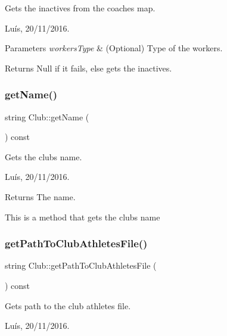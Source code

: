 Gets the inactives from the coaches map. 

Luís, 20/11/2016. 


\begin{DoxyParams}{Parameters}
{\em workers\+Type} & (Optional) Type of the workers. \\
\hline
\end{DoxyParams}


\begin{DoxyReturn}{Returns}
Null if it fails, else gets the inactives. 
\end{DoxyReturn}
\hypertarget{class_club_a68e75a8eba166549cffc62f53b448ad7}{}\label{class_club_a68e75a8eba166549cffc62f53b448ad7} 
\subsubsection{\texorpdfstring{get\+Name()}{getName()}}
{\footnotesize\ttfamily string Club\+::get\+Name (\begin{DoxyParamCaption}{ }\end{DoxyParamCaption}) const}



Gets the club\textquotesingle{}s name. 

Luís, 20/11/2016. 

\begin{DoxyReturn}{Returns}
The name. 
\end{DoxyReturn}


This is a method that gets the club\textquotesingle{}s name \hypertarget{class_club_a08b6495dcd132fd4e7215af14f72234e}{}\label{class_club_a08b6495dcd132fd4e7215af14f72234e} 
\subsubsection{\texorpdfstring{get\+Path\+To\+Club\+Athletes\+File()}{getPathToClubAthletesFile()}}
{\footnotesize\ttfamily string Club\+::get\+Path\+To\+Club\+Athletes\+File (\begin{DoxyParamCaption}{ }\end{DoxyParamCaption}) const}



Gets path to the club athletes file. 

Luís, 20/11/2016. 

